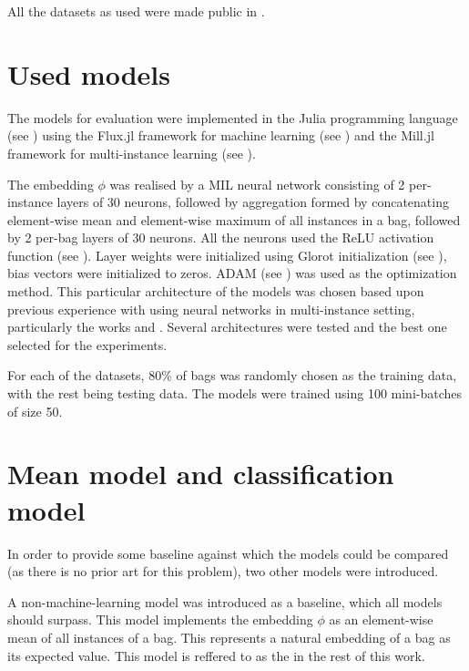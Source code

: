 All the datasets as used were made public in \cite{dedic_mildatasetsjl_2019}.

\section{Used models}

The models for evaluation were implemented in the Julia programming language (see \cite{bezanson_julia:_2017}) using the Flux.jl framework for machine learning (see \cite{innes_flux:_2018}) and the Mill.jl framework for multi-instance learning (see \cite{pevny_milljl_2019}).

The embedding \( \phi \) was realised by a MIL neural network consisting of 2 per-instance layers of 30 neurons, followed by aggregation formed by concatenating element-wise mean and element-wise maximum of all instances in a bag, followed by 2 per-bag layers of 30 neurons. All the neurons used the ReLU activation function (see \cite{hahnloser_digital_2000}). Layer weights were initialized using Glorot initialization (see \cite{glorot_understanding_2010}), bias vectors were initialized to zeros. ADAM (see \cite{kingma_adam:_2014}) was used as the optimization method. This particular architecture of the models was chosen based upon previous experience with using neural networks in multi-instance setting, particularly the works \cite{dedic_hierarchicke_2017} and \cite{pevny_nested_2020}. Several architectures were tested and the best one selected for the experiments.

For each of the datasets, 80\% of bags was randomly chosen as the training data, with the rest being testing data. The models were trained using 100 mini-batches of size 50.

\section{Mean model and classification model}\label{sec:baseline-models}

In order to provide some baseline against which the models could be compared (as there is no prior art for this problem), two other models were introduced.

A non-machine-learning model was introduced as a baseline, which all models should surpass. This model implements the embedding \( \phi \) as an element-wise mean of all instances of a bag. This represents a natural embedding of a bag as its expected value. This model is reffered to as the  in the rest of this work.

